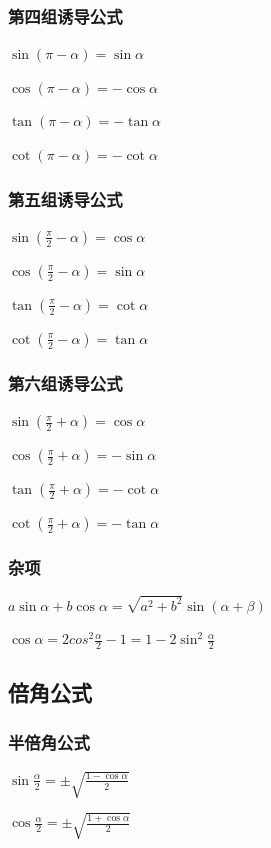 \documentclass[UTF8]{ctexbook}
\begin{document}
{{{  \subsubsection{第四组诱导公式}{
    $\sin(\pi - \alpha) = \sin\alpha$

    $\cos(\pi - \alpha) = -\cos\alpha$

    $\tan(\pi - \alpha) = -\tan\alpha$

    $\cot(\pi - \alpha) = -\cot\alpha$
  }

  \subsubsection{第五组诱导公式}{
    $\sin(\frac{\pi}{2} - \alpha) = \cos\alpha$

    $\cos(\frac{\pi}{2} - \alpha) = \sin\alpha$

    $\tan(\frac{\pi}{2} - \alpha) = \cot\alpha$

    $\cot(\frac{\pi}{2} - \alpha) = \tan\alpha$
  }

  \subsubsection{第六组诱导公式}{
    $\sin(\frac{\pi}{2} + \alpha) = \cos\alpha$

    $\cos(\frac{\pi}{2} + \alpha) = -\sin\alpha$

    $\tan(\frac{\pi}{2} + \alpha) = -\cot\alpha$

    $\cot(\frac{\pi}{2} + \alpha) = -\tan\alpha$
  }

  \subsubsection{杂项}{
    $a\sin\alpha + b\cos\alpha = \sqrt{a^2 + b^2}\sin(\alpha+\beta)$

    $\cos\alpha = 2cos^2\frac{\alpha}{2} - 1 = 1-2\sin^2\frac{\alpha}{2}$
  }

}

\subsection{倍角公式}{
\subsubsection{半倍角公式}{
  $\sin\frac{\alpha}{2} = \pm\sqrt{\frac{1 - \cos\alpha}{2}}$

  $\cos\frac{\alpha}{2} = \pm\sqrt{\frac{1 + \cos\alpha}{2}}$

}}}}
\end{document}

